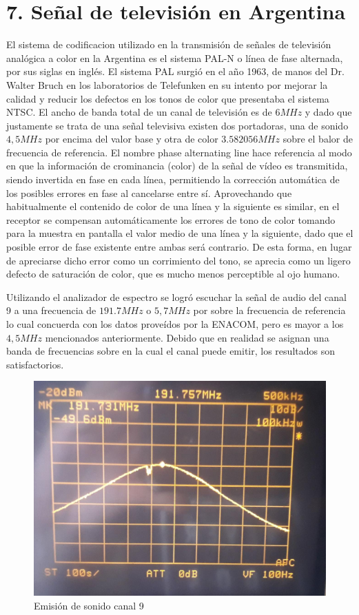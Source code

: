 \section{7. Se\~nal de televisi\'on en Argentina}

El sistema de codificacion utilizado en la transmisión de señales de televisión analógica a color en la Argentina es el sistema PAL-N o l\'inea de fase alternada, por sus siglas en ingl\'es. El sistema PAL surgió en el año 1963, de manos del Dr. Walter Bruch en los laboratorios de Telefunken en su intento por mejorar la calidad y reducir los defectos en los tonos de color que presentaba el sistema NTSC. El ancho de banda total de un canal de televisión es de $6 MHz$ y dado que justamente se trata de una señal televisiva existen dos portadoras, una de sonido $4,5 MHz$ por encima del valor base y otra de color $3.582056 MHz$ sobre el balor de frecuencia de referencia. El nombre phase alternating line  hace referencia al modo en que la información de crominancia (color) de la señal de vídeo es transmitida, siendo invertida en fase en cada línea, permitiendo la corrección automática de los posibles errores en fase al cancelarse entre sí. Aprovechando que habitualmente el contenido de color de una línea y la siguiente es similar, en el receptor se compensan automáticamente los errores de tono de color tomando para la muestra en pantalla el valor medio de una línea y la siguiente, dado que el posible error de fase existente entre ambas será contrario. De esta forma, en lugar de apreciarse dicho error como un corrimiento del tono, se aprecia como un ligero defecto de saturación de color, que es mucho menos perceptible al ojo humano.\newline


Utilizando el analizador de espectro se logró escuchar la señal de audio del canal 9 a una frecuencia de $191.7 MHz$ o $5,7MHz$ por sobre la frecuencia de referencia lo cual concuerda con los datos proveídos por la ENACOM, pero es mayor a los $4,5MHz$ mencionados anteriormente. Debido que en realidad se asignan una banda de frecuencias sobre en la cual el canal puede emitir, los resultados son satisfactorios. 


\begin{figure}[H]
    \centering
    \includegraphics[scale=0.3]{Recursos/Canal9.jpeg}
    \caption{Emisión de sonido canal 9}
\end{figure}


